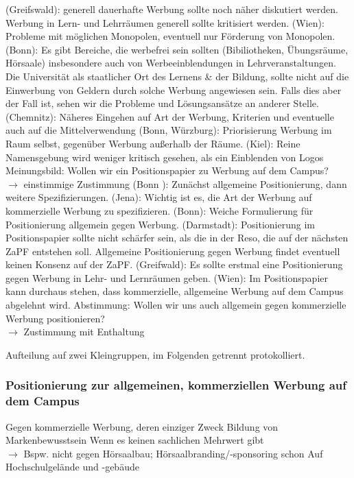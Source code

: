 \begin{outline}
			\1 (Greifswald): generell dauerhafte Werbung sollte noch näher diskutiert werden. Werbung in Lern- und Lehrräumen generell sollte kritisiert werden.
			\1 (Wien): Probleme mit möglichen Monopolen, eventuell nur Förderung von Monopolen.
			\1 (Bonn): Es gibt Bereiche, die werbefrei sein sollten (Bibiliotheken, Übungsräume, Hörsaale) insbesondere auch von Werbeeinblendungen in Lehrveranstaltungen. Die Universität als staatlicher Ort des Lernens \& der Bildung, sollte nicht auf die Einwerbung von Geldern durch solche Werbung angewiesen sein. Falls dies aber der Fall ist, sehen wir die Probleme und Lösungsansätze an anderer Stelle.
			\1 (Chemnitz): Näheres Eingehen auf Art der Werbung, Kriterien und eventuelle auch auf die  Mittelverwendung
			\1 (Bonn, Würzburg): Priorisierung Werbung im Raum selbst, gegenüber Werbung außerhalb der Räume.
			\1 (Kiel): Reine Namensgebung wird weniger kritisch gesehen, als ein Einblenden von Logos
			\1 Meinungsbild: Wollen wir ein Positionspapier zu Werbung auf dem Campus? \\ $\rightarrow$ einstimmige Zustimmung
			\1 (Bonn ): Zunächst allgemeine Positionierung, dann weitere Spezifizierungen.
			\1 (Jena): Wichtig ist es, die Art der Werbung auf kommerzielle Werbung zu spezifizieren.
			\1 (Bonn): Weiche Formulierung für Positionierung allgemein gegen Werbung.
			\1 (Darmstadt): Positionierung im Positionspapier sollte nicht schärfer sein, als die in der Reso, die auf der nächsten ZaPF entstehen soll. Allgemeine Positionierung gegen Werbung findet eventuell keinen Konsenz auf der ZaPF.
			\1 (Greifwald):  Es sollte erstmal eine Positionierung gegen Werbung in Lehr- und Lernräumen geben.
			\1 (Wien): Im Positionspapier kann durchaus stehen, dass kommerzielle, allgemeine Werbung auf dem Campus abgelehnt wird.
			\1 Abstimmung: Wollen wir uns auch allgemein gegen kommerzielle Werbung positionieren? \\ $\rightarrow$ Zustimmung mit Enthaltung
		\end{outline}
		Aufteilung auf zwei Kleingruppen, im Folgenden getrennt protokolliert.

		\subsubsection*{Positionierung zur allgemeinen, kommerziellen Werbung auf dem Campus}
			\begin{outline}
				\1 Gegen kommerzielle Werbung, deren einziger Zweck Bildung von Markenbewusstsein
				\1 Wenn es keinen sachlichen Mehrwert gibt \\
				$\rightarrow$ Bspw. nicht gegen Hörsaalbau; Hörsaalbranding/-sponsoring schon
				\1 Auf Hochschulgelände und -gebäude
			\end{outline}

